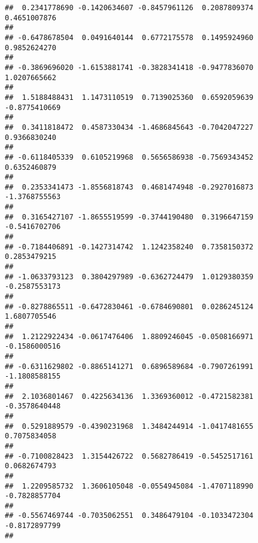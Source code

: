 \documentclass[]{article}
\begin{document}
\begin{verbatim}
##  0.2341778690 -0.1420634607 -0.8457961126  0.2087809374  0.4651007876 
##                                                                       
## -0.6478678504  0.0491640144  0.6772175578  0.1495924960  0.9852624270 
##                                                                       
## -0.3869696020 -1.6153881741 -0.3828341418 -0.9477836070  1.0207665662 
##                                                                       
##  1.5188488431  1.1473110519  0.7139025360  0.6592059639 -0.8775410669 
##                                                                       
##  0.3411818472  0.4587330434 -1.4686845643 -0.7042047227  0.9366830240 
##                                                                       
## -0.6118405339  0.6105219968  0.5656586938 -0.7569343452  0.6352460879 
##                                                                       
##  0.2353341473 -1.8556818743  0.4681474948 -0.2927016873 -1.3768755563 
##                                                                       
##  0.3165427107 -1.8655519599 -0.3744190480  0.3196647159 -0.5416702706 
##                                                                       
## -0.7184406891 -0.1427314742  1.1242358240  0.7358150372  0.2853479215 
##                                                                       
## -1.0633793123  0.3804297989 -0.6362724479  1.0129380359 -0.2587553173 
##                                                                       
## -0.8278865511 -0.6472830461 -0.6784690801  0.0286245124  1.6807705546 
##                                                                       
##  1.2122922434 -0.0617476406  1.8809246045 -0.0508166971 -0.1586000516 
##                                                                       
## -0.6311629802 -0.8865141271  0.6896589684 -0.7907261991 -1.1808588155 
##                                                                       
##  2.1036801467  0.4225634136  1.3369360012 -0.4721582381 -0.3578640448 
##                                                                       
##  0.5291889579 -0.4390231968  1.3484244914 -1.0417481655  0.7075834058 
##                                                                       
## -0.7100828423  1.3154426722  0.5682786419 -0.5452517161  0.0682674793 
##                                                                       
##  1.2209585732  1.3606105048 -0.0554945084 -1.4707118990 -0.7828857704 
##                                                                       
## -0.5567469744 -0.7035062551  0.3486479104 -0.1033472304 -0.8172897799 
##                                                                       

\end{verbatim}
\end{document}
